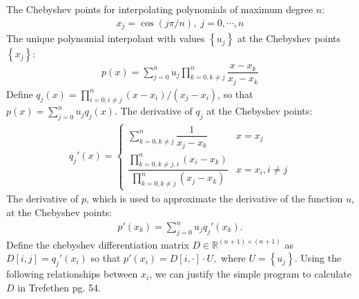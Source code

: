 \documentclass{article}
\begin{document}
The Chebyshev points for interpolating polynomials of maximum degree 
$n$:
\begin{align}
	x_j = \cos(j \pi/n), \; j=0,\cdots,n
\end{align}
The unique polynomial interpolant with values $\left\{u_j\right\}$ at the 
 Chebyshev points $\left\{x_j\right\}$:
\begin{align}
	p(x) = \sum_{j=0}^n u_j \prod_{k=0,k\neq j}^n  
	\dfrac{x-x_k}{x_j-x_k}
\end{align}
Define $q_j(x) = \prod_{i=0,i\neq j}^n (x - x_i)/(x_j - x_i) $, so 
that $p(x) = \sum_{j=0}^n u_j q_j(x)$. The derivative 
of $q_j$ at the Chebyshev points:
\begin{align}
	\label{eqn:DijRaw}
	q_j'(x) = \begin{cases} 
	\sum_{k=0,k\neq j}^n 
	\dfrac{1}{x_j - x_k} & x = x_j \\ 
	\dfrac{\prod_{k=0,k\neq j,i}^n (x_i - x_k)}
	{\prod_{k=0,k\neq j}^n (x_j - x_k)} & x = x_i, i \neq j 
	\end{cases}
\end{align}
The derivative of $p$, which is used to approximate the derivative of 
the function $u$, at the Chebyshev points:
\begin{align}
	p'(x_k) = \sum_{j=0}^n u_j q_j'(x_k).
\end{align}
Define the chebyshev differentiation matrix $D \in \mathbb{R}^{(n+1)\times (n+1)}$ as $D[i,j] = q_j'(x_i)$ so that 
$p'(x_i) = D[i,\cdot]\cdot U,$ where $U = \left\{u_j\right\}$. Using the following relationships between $x_i$, we can 
justify the simple program to calculate $D$ in Trefethen pg. 54. 
\end{document}
